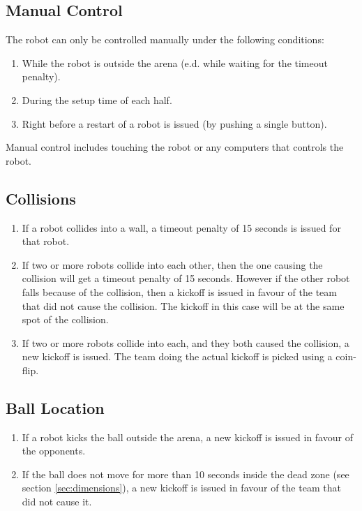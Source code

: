 \documentclass[a4paper, 12pt, oneside]{article}
\begin{document}
\subsection{Manual Control}

The robot can only be controlled manually under the following conditions:
\begin{enumerate}
    \item While the robot is outside the arena (e.d. while waiting for the timeout penalty).
    \item During the setup time of each half.
    \item Right before a restart of a robot is issued (by pushing a single button).
\end{enumerate}

Manual control includes touching the robot or any computers that controls the robot.

\subsection{Collisions}

\begin{enumerate}
    \item If a robot collides into a wall, a timeout penalty of 15 seconds is issued for that robot.
    \item If two or more robots collide into each other, then the one causing the collision will get a timeout penalty of 15 seconds.
        However if the other robot falls because of the collision, then a kickoff is issued in favour of the team that did not cause the collision.
        The kickoff in this case will be at the same spot of the collision.
    \item If two or more robots collide into each, and they both caused the collision, a new kickoff is issued.
        The team doing the actual kickoff is picked using a coin-flip.
\end{enumerate}

\subsection{Ball Location}

\begin{enumerate}
    \item If a robot kicks the ball outside the arena, a new kickoff is issued in favour of the opponents.
    \item If the ball does not move for more than 10 seconds inside the dead zone (see section \ref{sec:dimensions}), a new kickoff is issued in favour of the team that did not cause it.
\end{enumerate}
\end{document}
